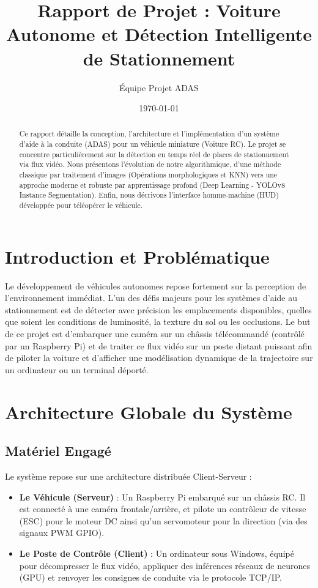 \documentclass[12pt,a4paper]{article}
\title{\textbf{Rapport de Projet : Voiture Autonome et Détection Intelligente de Stationnement}}
\author{Équipe Projet ADAS}
\date{\today}
\begin{document}
\maketitle

\begin{abstract}
Ce rapport détaille la conception, l'architecture et l'implémentation d'un système d'aide à la conduite (ADAS) pour un véhicule miniature (Voiture RC). Le projet se concentre particulièrement sur la détection en temps réel de places de stationnement via flux vidéo. Nous présentons l'évolution de notre algorithmique, d'une méthode classique par traitement d'images (Opérations morphologiques et KNN) vers une approche moderne et robuste par apprentissage profond (Deep Learning - YOLOv8 Instance Segmentation). Enfin, nous décrivons l'interface homme-machine (HUD) développée pour téléopérer le véhicule.
\end{abstract}

\tableofcontents
\newpage

\section{Introduction et Problématique}
Le développement de véhicules autonomes repose fortement sur la perception de l'environnement immédiat. L'un des défis majeurs pour les systèmes d'aide au stationnement est de détecter avec précision les emplacements disponibles, quelles que soient les conditions de luminosité, la texture du sol ou les occlusions. 
Le but de ce projet est d'embarquer une caméra sur un châssis télécommandé (contrôlé par un Raspberry Pi) et de traiter ce flux vidéo sur un poste distant puissant afin de piloter la voiture et d'afficher une modélisation dynamique de la trajectoire sur un ordinateur ou un terminal déporté.

\section{Architecture Globale du Système}

\subsection{Matériel Engagé}
Le système repose sur une architecture distribuée Client-Serveur :
\begin{itemize}
    \item \textbf{Le Véhicule (Serveur)} : Un Raspberry Pi embarqué sur un châssis RC. Il est connecté à une caméra frontale/arrière, et pilote un contrôleur de vitesse (ESC) pour le moteur DC ainsi qu'un servomoteur pour la direction (via des signaux PWM GPIO).
    \item \textbf{Le Poste de Contrôle (Client)} : Un ordinateur sous Windows, équipé pour décompresser le flux vidéo, appliquer des inférences réseaux de neurones (GPU) et renvoyer les consignes de conduite via le protocole TCP/IP.
\end{itemize}
\end{document}
